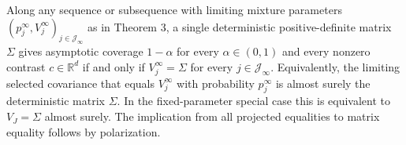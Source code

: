 Along any sequence or subsequence with limiting mixture parameters \((p_j^\infty,V_j^\infty)_{j\in\mathcal J_\infty}\) as in Theorem 3, a single deterministic positive-definite matrix \(\Sigma\) gives asymptotic coverage \(1-\alpha\) for every \(\alpha\in(0,1)\) and every nonzero contrast \(c\in\mathbb R^d\) if and only if \(V_j^\infty=\Sigma\) for every \(j\in\mathcal J_\infty\). Equivalently, the limiting selected covariance that equals \(V_j^\infty\) with probability \(p_j^\infty\) is almost surely the deterministic matrix \(\Sigma\). In the fixed-parameter special case this is equivalent to \(V_J=\Sigma\) almost surely. The implication from all projected equalities to matrix equality follows by polarization.